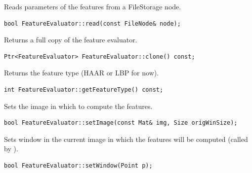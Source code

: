 Reads parameters of the features from a FileStorage node.

\begin{lstlisting}
bool FeatureEvaluator::read(const FileNode& node);
\end{lstlisting}

\begin{description}
\end{description}

Returns a full copy of the feature evaluator.

\begin{lstlisting}
Ptr<FeatureEvaluator> FeatureEvaluator::clone() const;
\end{lstlisting}

Returns the feature type (HAAR or LBP for now).

\begin{lstlisting}
int FeatureEvaluator::getFeatureType() const;
\end{lstlisting}

Sets the image in which to compute the features.

\begin{lstlisting}
bool FeatureEvaluator::setImage(const Mat& img, Size origWinSize);
\end{lstlisting}

\begin{description}
\end{description}

Sets window in the current image in which the features will be computed (called by ).

\begin{lstlisting}
bool FeatureEvaluator::setWindow(Point p); 
\end{lstlisting}

\begin{description}
\end{description}

